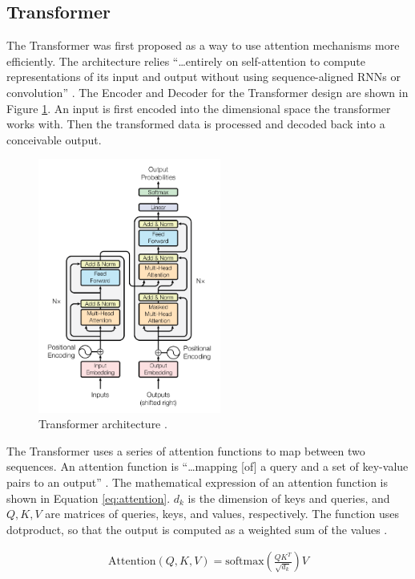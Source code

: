 \documentclass[letterpaper]{article} %
\begin{document}
\subsection{Transformer}
The Transformer was first proposed
as a way to use attention mechanisms more efficiently.
The architecture relies
``\dots entirely on self-attention to compute representations of its input and output
without using sequence-aligned RNNs or convolution''
\cite{attention_need}.
The Encoder and Decoder for the Transformer design
are shown in Figure \ref{fig:attention}.
An input is first encoded into the dimensional space
the transformer works with.
Then the transformed data is processed
and decoded back into a conceivable output.

\begin{figure}[htbp]
\centerline{\includegraphics[width=6cm]{attention_architecture.png}}
\caption{Transformer architecture
\cite{attention_need}.}
\label{fig:attention}
\end{figure}

The Transformer uses a series of attention functions to map
between two sequences.
An attention function is
``\dots mapping [of] a query and a
set of key-value pairs to an output''
\cite{attention_need}.
The mathematical expression of an attention function is shown in
Equation \ref{eq:attention}.
$d_k$ is the dimension of keys and queries, and
$Q,K,V$ are matrices of queries, keys, and values, respectively.
The function uses dotproduct, so that the output is computed as
a weighted sum of the values
\cite{attention_need}.

\begin{equation}
\label{eq:attention}
\begin{split}
\text{Attention}(Q,K,V) = \text{softmax}(\frac{QK^T}{\sqrt{d_k}})V
\end{split}
\end{equation}
\end{document}
